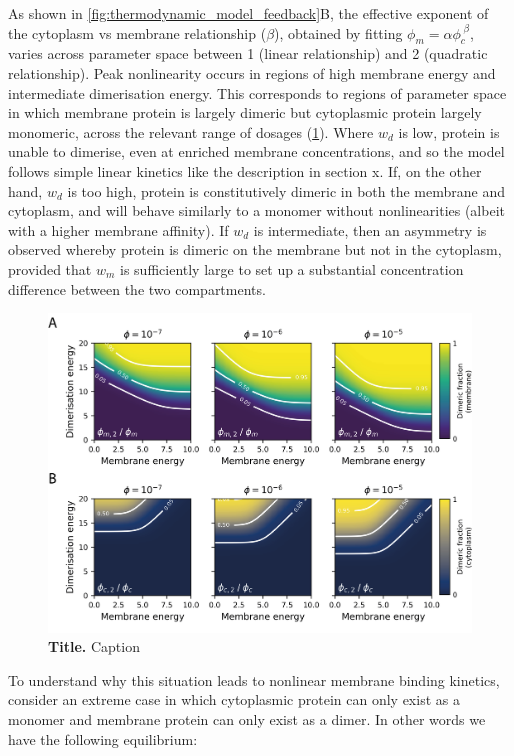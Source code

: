 \documentclass[12pt]{"report"}
\newcommand{\mycaption}[2]{\caption[#1]{\textbf{#1.} #2}}
\begin{document}
As shown in \cref{fig:thermodynamic_model_feedback}B, the effective exponent of the cytoplasm vs membrane relationship ($\beta$), obtained by fitting $\phi_m = \alpha \phi_c^{\;\beta}$, varies across parameter space between 1 (linear relationship) and 2 (quadratic relationship). Peak nonlinearity occurs in regions of high membrane energy and intermediate dimerisation energy. This corresponds to regions of parameter space in which membrane protein is largely dimeric but cytoplasmic protein largely monomeric, across the relevant range of dosages (\cref{fig:thermodynamic_model_dimer_fractions}). Where $w_d$ is low, protein is unable to dimerise, even at enriched membrane concentrations, and so the model follows simple linear kinetics like the description in section x. If, on the other hand, $w_d$ is too high, protein is constitutively dimeric in both the membrane and cytoplasm, and will behave similarly to a monomer without nonlinearities (albeit with a higher membrane affinity). If $w_d$ is intermediate, then an asymmetry is observed whereby protein is dimeric on the membrane but not in the cytoplasm, provided that $w_m$ is sufficiently large to set up a substantial concentration difference between the two compartments.\\

\begin{figure}
\includegraphics[scale=0.9]{thermodynamic_model_dimer_fractions}
\centering
\mycaption{Title}{Caption}
\label{fig:thermodynamic_model_dimer_fractions}
\end{figure}

To understand why this situation leads to nonlinear membrane binding kinetics, consider an extreme case in which cytoplasmic protein can only exist as a monomer and membrane protein can only exist as a dimer. In other words we have the following equilibrium:
\end{document}
